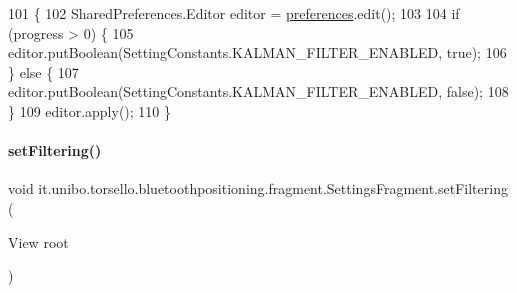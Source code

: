 \begin{DoxyCode}
101                                                       \{
102         SharedPreferences.Editor editor = \hyperlink{classit_1_1unibo_1_1torsello_1_1bluetoothpositioning_1_1fragment_1_1SettingsFragment_a52480c4d5d81ca59fe4a98ae3c623ea4_a52480c4d5d81ca59fe4a98ae3c623ea4}{preferences}.edit();
103 
104         \textcolor{keywordflow}{if} (progress > 0) \{
105             editor.putBoolean(SettingConstants.KALMAN\_FILTER\_ENABLED, \textcolor{keyword}{true});
106         \} \textcolor{keywordflow}{else} \{
107             editor.putBoolean(SettingConstants.KALMAN\_FILTER\_ENABLED, \textcolor{keyword}{false});
108         \}
109         editor.apply();
110     \}
\end{DoxyCode}
\hypertarget{classit_1_1unibo_1_1torsello_1_1bluetoothpositioning_1_1fragment_1_1SettingsFragment_a0d7b911602439aaf2a9ee4d5f9e41088_a0d7b911602439aaf2a9ee4d5f9e41088}{}\label{classit_1_1unibo_1_1torsello_1_1bluetoothpositioning_1_1fragment_1_1SettingsFragment_a0d7b911602439aaf2a9ee4d5f9e41088_a0d7b911602439aaf2a9ee4d5f9e41088} 
\paragraph{\texorpdfstring{set\+Filtering()}{setFiltering()}}
{\footnotesize\ttfamily void it.\+unibo.\+torsello.\+bluetoothpositioning.\+fragment.\+Settings\+Fragment.\+set\+Filtering (\begin{DoxyParamCaption}\item[{View}]{root }\end{DoxyParamCaption})\hspace{0.3cm}{\ttfamily [private]}}


